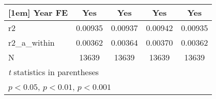 {\begin{tabular}{l*{4}{c}}
[1em]
Year FE     &         Yes         &         Yes         &         Yes         &         Yes         \\
\hline
r2          &     0.00935         &     0.00937         &     0.00942         &     0.00935         \\
r2\_a\_within &     0.00362         &     0.00364         &     0.00370         &     0.00362         \\
N           &       13639         &       13639         &       13639         &       13639         \\
\hline\hline
\multicolumn{5}{l}{\footnotesize \textit{t} statistics in parentheses}\\
\multicolumn{5}{l}{\footnotesize \sym{*} \(p<0.05\), \sym{**} \(p<0.01\), \sym{***} \(p<0.001\)}\\
\end{tabular}
}
